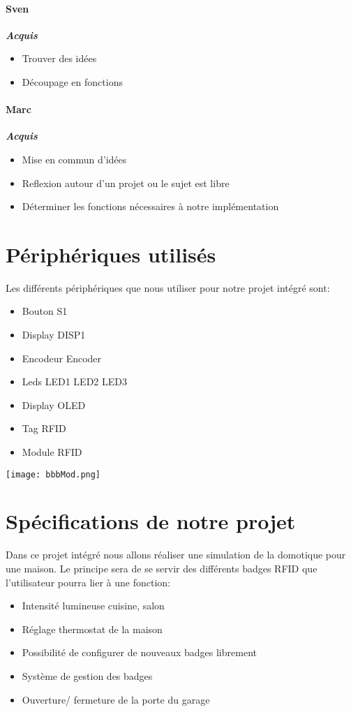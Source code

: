 \paragraph{Sven}

\textbf{\textit{Acquis}}
\begin{itemize}
    \item Trouver des idées
    \item Découpage en fonctions
\end{itemize}

\paragraph{Marc}

\textbf{\textit{Acquis}}
\begin{itemize}
    \item Mise en commun d'idées
    \item Reflexion autour d'un projet ou le sujet est libre
    \item Déterminer les fonctions nécessaires à notre implémentation
\end{itemize}


\newpage

\section{Périphériques utilisés}
Les différents périphériques que nous utiliser pour notre projet intégré sont:
\begin{itemize}
    \item Bouton S1
    \item Display DISP1
    \item Encodeur Encoder
    \item Leds LED1 LED2 LED3
    \item Display OLED 
    \item Tag RFID
    \item Module RFID
\end{itemize}
\texttt{[image: bbbMod.png]}

\section{Spécifications de notre projet}

Dans ce projet intégré nous allons réaliser une simulation de la domotique pour une maison. Le principe sera de se servir des différents badges RFID que l'utilisateur pourra lier à une fonction:
\begin{itemize}
    \item Intensité lumineuse cuisine, salon
    \item Réglage thermostat de la maison
    \item Possibilité de configurer de nouveaux badges librement
    \item Système de gestion des badges
    \item Ouverture/ fermeture de la porte du garage
\end{itemize}


